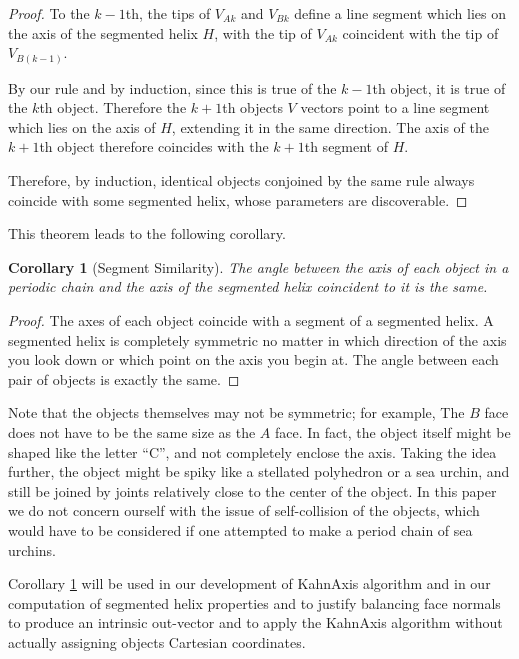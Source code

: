 \documentclass[11pt]{article}
\newtheorem{corollary}{Corollary}
\begin{document}
{\begin{proof}
  To the $k-1$th, the tips of  $V_{Ak}$ and $V_{Bk}$ define
  a line segment which lies on the axis of the segmented helix $H$, with the
  tip of $V_{Ak}$ coincident with the tip of $V_{B(k-1)}$.

  By our rule and by induction, since this is true of the $k-1$th object,
  it is true of the $k$th object. Therefore the $k+1$th objects $V$ vectors
  point to a line segment which lies on the axis of $H$, extending it
  in the same direction. The axis of the $k+1$th object therefore coincides
  with the $k+1$th segment of $H$.

  Therefore, by induction, identical objects conjoined by the same rule always
  coincide with some segmented helix, whose parameters are discoverable.
\end{proof}

This theorem leads to the following corollary.

\begin{corollary}[Segment Similarity]
  The angle between the axis of each object in a periodic chain and the axis of the
  segmented helix coincident to it is the same.
  \label{cor:symmetric}
\end{corollary}

\begin{proof}
  The axes of each object coincide with a segment of a segmented helix.
  A segmented helix is completely symmetric no matter in which direction
  of the axis you look down or which point on the axis you begin at. The angle between each pair of objects
  is exactly the same.
\end{proof}

Note that the objects themselves may not be symmetric; for example,
The $B$ face does not have to be the same size as the $A$ face. In fact,
the object itself might be shaped like the letter ``C'', and not completely
enclose the axis. Taking the idea further, the object might be spiky
like a stellated polyhedron or a sea urchin, and still be joined by
joints relatively close to the center of the object. In this paper
we do not concern ourself with the issue of self-collision of the objects,
which would have to be considered if one attempted to make a period chain
of sea urchins.

Corollary \ref{cor:symmetric} will be used in our development of KahnAxis algorithm
and in our computation of segmented helix properties and to justify balancing face normals
to produce an intrinsic out-vector and to apply the KahnAxis algorithm
without actually assigning objects Cartesian coordinates.

}
\end{document}
